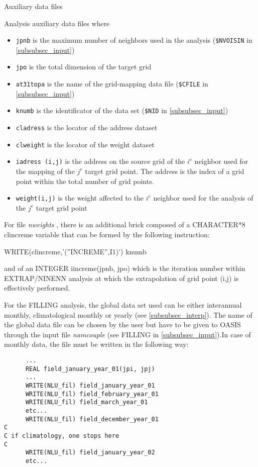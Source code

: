 \begin{subsection}{Auxiliary data files}
\begin{subsubsection}{Analysis auxiliary data files}
where 
\begin{itemize}
\item {\tt jpnb} is the maximum number of neighbors used in the analysis
({\tt \$NVOISIN} in \ref{subsubsec_input})
\item {\tt jpo} is the total dimension of the target grid
\item {\tt at31topa} is the name of the grid-mapping data file ({\tt \$CFILE}
in \ref{subsubsec_input})
\item {\tt knumb} is the identificator of the data set ({\tt \$NID} in
\ref{subsubsec_input}) 
\item {\tt cladress} is the locator of the address dataset
\item {\tt clweight} is the locator of the weight dataset
\item {\tt iadress (i,j)} is the address on the source grid of the $i^e$
neighbor used for the mapping of the $j^e$ target grid point. The
address is the index of a grid point within the total number of grid
points.
\item {\tt weight(i,j)} is the weight affected to the $i^e$
neighbor used for the analysis of the $j^e$ target grid point
\end{itemize}

For file {\em  nweights }, there is an additional brick composed of a
CHARACTER*8 clincreme variable that can be formed by the following 
instruction:

      WRITE(clincreme,'(''INCREME'',I1)') knumb

and of an INTEGER iincreme(jpnb, jpo) which is the iteration number
within EXTRAP/NINENN analysis at
which the extrapolation of grid point (i,j) is effectively performed.

For the FILLING analysis, the global data set used can be
either interannual monthly, climatological monthly or yearly (see
\ref{subsubsec_interp}). The name of the global data file 
can be chosen by the user but
have to be given to OASIS through the input file {\em namcouple} (see
FILLING in \ref{subsubsec_input}).In case of monthly data, the file 
must be written in the following way:
\begin{verbatim}
      ...
      REAL field_january_year_01(jpi, jpj)
      ...
      WRITE(NLU_fil) field_january_year_01
      WRITE(NLU_fil) field_february_year_01
      WRITE(NLU_fil) field_march_year_01
      etc...
      WRITE(NLU_fil) field_december_year_01
C
C if climatology, one stops here
C
      WRITE(NLU_fil) field_january_year_02
      etc...
\end{verbatim}


\end{subsubsection}
\end{subsection}
